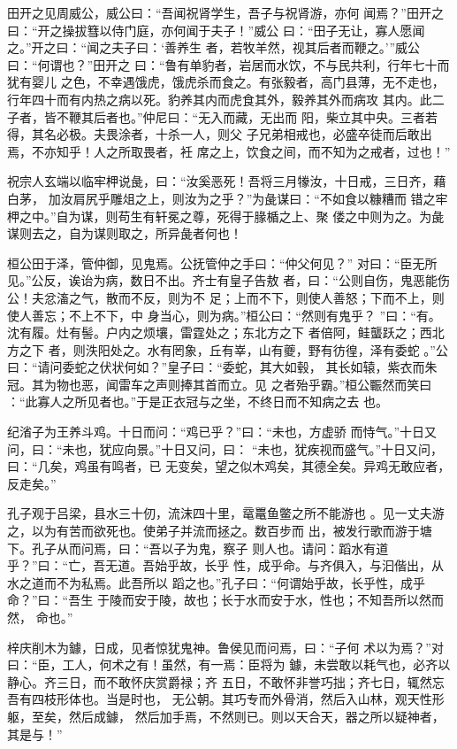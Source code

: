 \documentclass[12pt,UTF8]{ctexbook}
\begin{document}
田开之见周威公，威公曰：“吾闻祝肾学生，吾子与祝肾游，亦何 闻焉？”田开之曰：“开之操拔篲以侍门庭，亦何闻于夫子！”威公 曰：“田子无让，寡人愿闻之。”开之曰：“闻之夫子曰：‘善养生 者，若牧羊然，视其后者而鞭之。’”威公曰：“何谓也？”田开之 曰：“鲁有单豹者，岩居而水饮，不与民共利，行年七十而犹有婴儿 之色，不幸遇饿虎，饿虎杀而食之。有张毅者，高门县薄，无不走也， 行年四十而有内热之病以死。豹养其内而虎食其外，毅养其外而病攻 其内。此二子者，皆不鞭其后者也。”仲尼曰：“无入而藏，无出而 阳，柴立其中央。三者若得，其名必极。夫畏涂者，十杀一人，则父 子兄弟相戒也，必盛卒徒而后敢出焉，不亦知乎！人之所取畏者，衽 席之上，饮食之间，而不知为之戒者，过也！”

祝宗人玄端以临牢柙说彘，曰：“汝奚恶死！吾将三月㹖汝，十日戒，三日齐，藉白茅， 加汝肩尻乎雕俎之上，则汝为之乎？”为彘谋曰：“不如食以糠糟而 错之牢柙之中。”自为谋，则苟生有轩冕之尊，死得于腞楯之上、聚 偻之中则为之。为彘谋则去之，自为谋则取之，所异彘者何也！

桓公田于泽，管仲御，见鬼焉。公抚管仲之手曰：“仲父何见？” 对曰：“臣无所见。”公反，诶诒为病，数日不出。齐士有皇子告敖 者，曰：“公则自伤，鬼恶能伤公！夫忿滀之气，散而不反，则为不 足；上而不下，则使人善怒；下而不上，则使人善忘；不上不下，中 身当心，则为病。”桓公曰：“然则有鬼乎？ ”曰：“有。沈有履。灶有髻。户内之烦壤，雷霆处之；东北方之下 者倍阿，鲑蠪跃之；西北方之下 者，则泆阳处之。水有罔象，丘有峷，山有夔，野有彷徨，泽有委蛇 。”公曰：“请问委蛇之伏状何如？”皇子曰：“委蛇，其大如毂， 其长如辕，紫衣而朱冠。其为物也恶，闻雷车之声则捧其首而立。见 之者殆乎霸。”桓公辴然而笑曰 ：“此寡人之所见者也。”于是正衣冠与之坐，不终日而不知病之去 也。

纪渻子为王养斗鸡。十日而问：“鸡已乎？”曰：“未也，方虚骄 而恃气。”十日又问，曰：“未也，犹应向景。”十日又问，曰： “未也，犹疾视而盛气。”十日又问，曰：“几矣，鸡虽有鸣者，已 无变矣，望之似木鸡矣，其德全矣。异鸡无敢应者，反走矣。”

孔子观于吕梁，县水三十仞，流沫四十里，鼋鼍鱼鳖之所不能游也 。见一丈夫游之，以为有苦而欲死也。使弟子并流而拯之。数百步而 出，被发行歌而游于塘下。孔子从而问焉，曰：“吾以子为鬼，察子 则人也。请问：蹈水有道乎？”曰：“亡，吾无道。吾始乎故，长乎 性，成乎命。与齐俱入，与汩偕出，从水之道而不为私焉。此吾所以 蹈之也。”孔子曰：“何谓始乎故，长乎性，成乎命？”曰：“吾生 于陵而安于陵，故也；长于水而安于水，性也；不知吾所以然而然， 命也。”

梓庆削木为鐻，日成，见者惊犹鬼神。鲁侯见而问焉，曰：“子何 术以为焉？”对曰：“臣，工人，何术之有！虽然，有一焉：臣将为 鐻，未尝敢以耗气也，必齐以静心。齐三日，而不敢怀庆赏爵禄；齐 五日，不敢怀非誉巧拙；齐七日，辄然忘吾有四枝形体也。当是时也， 无公朝。其巧专而外骨消，然后入山林，观天性形躯，至矣，然后成鐻， 然后加手焉，不然则已。则以天合天，器之所以疑神者，其是与！”
\end{document}
